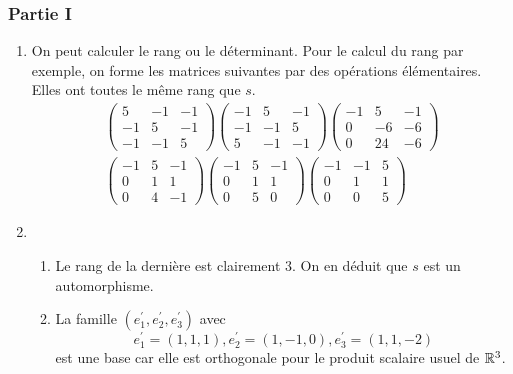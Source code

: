 \subsubsection*{Partie I}
\begin{enumerate}
 \item On peut calculer le rang ou le déterminant. Pour le calcul du rang par exemple, on forme les matrices suivantes par des opérations élémentaires. Elles ont toutes le même rang que $s$.
\begin{eqnarray*}
 \left( \begin{array}{ccc}
5 & -1 & -1 \\
-1 & 5 & -1 \\
-1 & -1 & 5
        \end{array}\right) 
 \left( \begin{array}{ccc}
-1 & 5 & -1 \\
-1 & -1 & 5 \\
5 & -1 & -1
        \end{array}\right) 
 \left( \begin{array}{ccc}
-1 & 5 & -1 \\
0 & -6 & -6 \\
0 & 24 & -6
        \end{array}\right) \\ 
 \left( \begin{array}{ccc}
-1 & 5 & -1 \\
0 & 1 & 1 \\
0 & 4 & -1
        \end{array}\right) 
 \left( \begin{array}{ccc}
-1 & 5 & -1 \\
0 & 1 & 1 \\
0 & 5 & 0
        \end{array}\right) 
 \left( \begin{array}{ccc}
-1 & -1 & 5 \\
0 & 1 & 1 \\
0 & 0 & 5
        \end{array}\right) 
\end{eqnarray*}
\item \begin{enumerate}
 \item Le rang de la dernière est clairement 3. On en déduit que $s$ est un automorphisme.
\item La famille $(e^{\prime}_1,e^{\prime}_2,e^{\prime}_3)$ avec
\[e^{\prime}_1=(1,1,1),e^{\prime}_2=(1,-1,0),e^{\prime}_3=(1,1,-2)\]
est une base car elle est orthogonale pour le produit scalaire usuel de $\mathbb{R}^3$.

\end{enumerate}
\end{enumerate}
